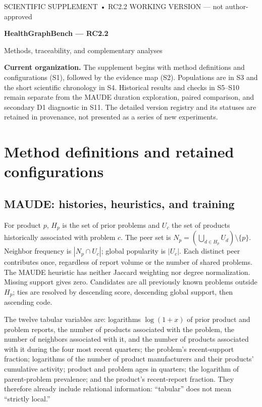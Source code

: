 \documentclass[10pt,a4paper]{article}
\begin{document}
\begin{center}
{\small SCIENTIFIC SUPPLEMENT • RC2.2 WORKING VERSION — not author-approved}\par\vspace{7pt}
{\LARGE\bfseries HealthGraphBench — RC2.2}\par\vspace{6pt}
{\large Methods, traceability, and complementary analyses}
\end{center}

\textbf{Current organization.} The supplement begins with method definitions and configurations (S1), followed by the evidence map (S2). Populations are in S3 and the short scientific chronology in S4. Historical results and checks in S5--S10 remain separate from the MAUDE duration exploration, paired comparison, and secondary D1 diagnostic in S11. The detailed version registry and its statuses are retained in provenance, not presented as a series of new experiments.

\par{}
\section{Method definitions and retained configurations}
\label{supp:methods}
\subsection{MAUDE: histories, heuristics, and training}
For product $p$, $H_p$ is the set of prior problems and $U_c$ the set of products historically associated with problem $c$. The peer set is $N_p=(\bigcup_{d\in H_p}U_d)\setminus\{p\}$. Neighbor frequency is $|N_p\cap U_c|$; global popularity is $|U_c|$. Each distinct peer contributes once, regardless of report volume or the number of shared problems. The MAUDE heuristic has neither Jaccard weighting nor degree normalization. Missing support gives zero. Candidates are all previously known problems outside $H_p$; ties are resolved by descending score, descending global support, then ascending code\cite{hgbcode}.

The twelve tabular variables are: logarithms $\log(1+x)$ of prior product and problem reports, the number of products associated with the problem, the number of neighbors associated with it, and the number of products associated with it during the four most recent quarters; the problem's recent-support fraction; logarithms of the number of product manufacturers and their products' cumulative activity; product and problem ages in quarters; the logarithm of parent-problem prevalence; and the product's recent-report fraction. They therefore already include relational information: “tabular” does not mean “strictly local.”
\end{document}
